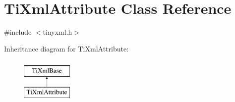 \hypertarget{classTiXmlAttribute}{\section{Ti\-Xml\-Attribute Class Reference}
\label{classTiXmlAttribute}
}


{\ttfamily \#include $<$tinyxml.\-h$>$}

Inheritance diagram for Ti\-Xml\-Attribute\-:\begin{figure}[H]
\begin{center}
\leavevmode
\includegraphics[height=2.000000cm]{classTiXmlAttribute}
\end{center}
\end{figure}
